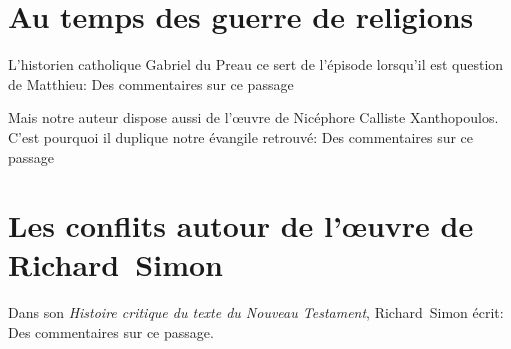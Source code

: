 \documentclass[a4paper]{article}
\begin{document}
\section{Au temps des guerre de religions}
L'historien catholique Gabriel du Preau ce sert de l'épisode lorsqu'il est question de Matthieu:
Des commentaires sur ce passage

Mais notre auteur dispose aussi de l'œuvre de Nicéphore Calliste Xanthopoulos. C'est pourquoi il duplique notre évangile retrouvé:
Des commentaires sur ce passage
\section{Les conflits autour de l'œuvre de Richard~Simon}
Dans son \emph{Histoire critique du texte du Nouveau Testament}, Richard~Simon écrit:
Des commentaires sur ce passage.
\end{document}
